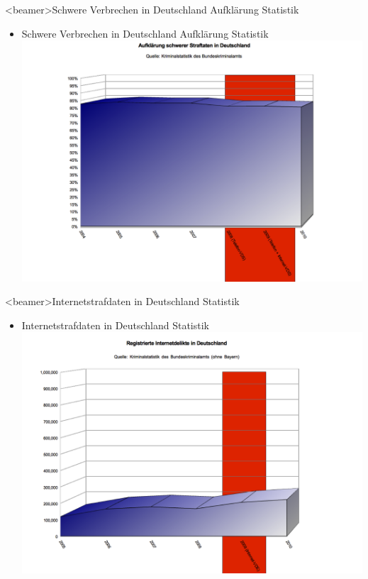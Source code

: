     \begin{frame}<beamer>{Schwere Verbrechen in Deutschland Aufklärung Statistik}
\begin{itemize}
        \item Schwere Verbrechen in Deutschland Aufklärung Statistik
        \includegraphics[height=1\textheight]{sections/img/aufklaerung_in_DE.png}
    \end{itemize}
    \end{frame}
      \begin{frame}<beamer>{Internetstrafdaten in Deutschland Statistik}
\begin{itemize}
        \item Internetstrafdaten in Deutschland Statistik
        \includegraphics[height=1\textheight]{sections/img/internet_delikte_in_DE.png}
    \end{itemize}
    \end{frame}
